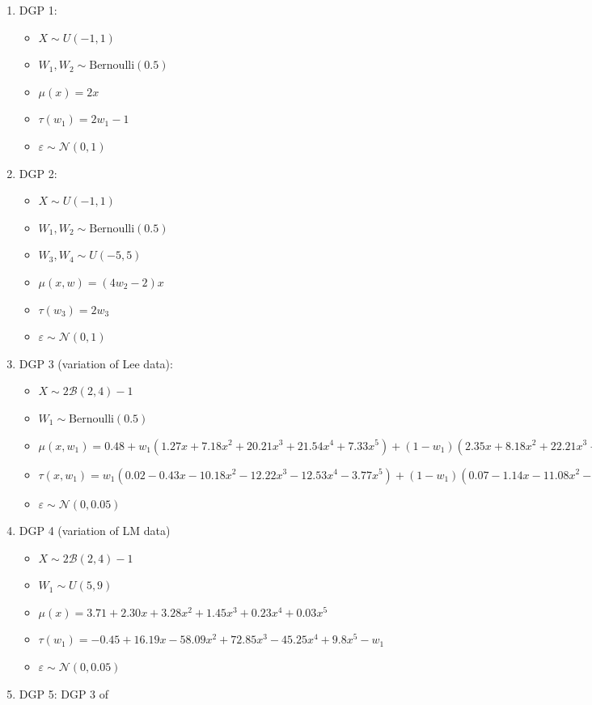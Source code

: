 \documentclass[11pt]{article}
\begin{document}
\begin{enumerate}
\item DGP 1:
\begin{itemize}
\item \(X \sim U(-1,1)\)
\item \(W_1,W_2 \sim \text{Bernoulli}(0.5)\)
\item \(\mu(x) = 2x\)
\item \(\tau(w_1) = 2 w_1 - 1\)
\item \(\varepsilon \sim \mathcal{N}(0,1)\)
\end{itemize}
\item DGP 2:
\begin{itemize}
\item \(X \sim U(-1,1)\)
\item \(W_1,W_2 \sim \text{Bernoulli}(0.5)\)
\item \(W_3,W_4 \sim U(-5,5)\)
\item \(\mu(x,w) = (4 w_2 - 2) x\)
\item \(\tau(w_3) = 2 w_3\)
\item \(\varepsilon \sim \mathcal{N}(0,1)\)
\end{itemize}
\item DGP 3 (variation of Lee data):
\begin{itemize}
\item \(X \sim 2 \mathcal{B}(2,4)-1\)
\item \(W_1 \sim \text{Bernoulli}(0.5)\)
\item \(\mu(x,w_1) = 0.48 + w_1(1.27 x + 7.18 x^2 + 20.21
     x^3 + 21.54 x^4 + 7.33 x^5) +(1-w_1)(2.35 x +
     8.18 x^2 + 22.21 x^3 + 24.14 x^4 + 8.33 x^5)\)
\item \(\tau(x,w_1) = w_1(0.02 - 0.43 x - 10.18 x^2 - 12.22
     x^3 - 12.53 x^4 - 3.77 x^5) + (1-w_1)(0.07 - 1.14 x -
     11.08 x^2 - 15.22 x^3 - 14.13 x^4 - 3.77 x^5)\)
\item \(\varepsilon \sim \mathcal{N}(0,0.05)\)
\end{itemize}
\item DGP 4 (variation of LM data)
\begin{itemize}
\item \(X \sim 2 \mathcal{B}(2,4)-1\)
\item \(W_1 \sim U(5,9)\)
\item \(\mu(x) = 3.71 + 2.30 x + 3.28 x^2 + 1.45 x^3 + 0.23
     x^4 + 0.03 x^5\)
\item \(\tau(w_1) = -0.45 + 16.19 x - 58.09 x^2 + 72.85 x^3 - 45.25
     x^4 + 9.8 x^5 - w_1\)
\item \(\varepsilon \sim \mathcal{N}(0,0.05)\)
\end{itemize}
\item DGP 5: DGP 3 of \cite{calonico2014robust}
\end{enumerate}
\end{document}
